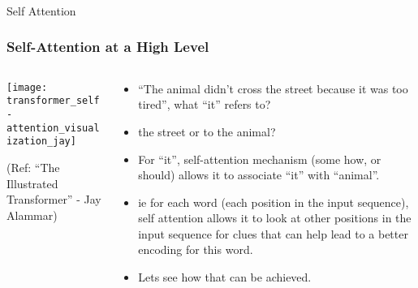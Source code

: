 \begin{frame}[fragile]\frametitle{}
\begin{center}
{\Large Self Attention}
\end{center}
\end{frame}

\begin{frame}[fragile]\frametitle{Self-Attention at a High Level}

\begin{columns}
    \begin{column}[T]{0.5\linewidth}
\begin{center}
\texttt{[image: transformer\_self-attention\_visualization\_jay]}


{\tiny (Ref: ``The Illustrated Transformer'' - Jay Alammar)}
\end{center}		

		\end{column}
    \begin{column}[T]{0.5\linewidth}

\begin{itemize}
\item ``The animal didn't cross the street because it was too tired'', what ``it'' refers to?
\item  the street or to the animal?
\item For “it”, self-attention mechanism (some how, or should) allows it to associate “it” with “animal”.
\item ie for each word (each position in the input sequence), self attention allows it to look at other positions in the input sequence for clues that can help lead to a better encoding for this word.
\item Lets see how that can be achieved.
\end{itemize}
    \end{column}
  \end{columns}
\end{frame}

